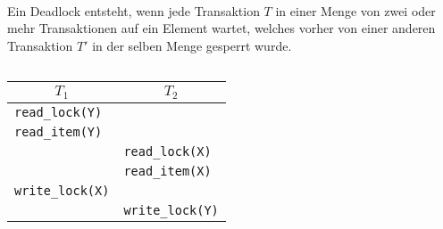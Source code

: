 \begin{frame}{\insertsection}
	\framesubtitle{\insertsubsection}
	\begin{definition}
		Ein Deadlock entsteht, wenn jede Transaktion $T$ in einer Menge von zwei oder mehr Transaktionen auf ein Element wartet, welches vorher von einer anderen Transaktion $T'$ in der selben Menge gesperrt wurde.
	\end{definition}	
	\begin{columns}
		\begin{column}{.48\textwidth}
			\begin{tabular}{p{3.0cm}|p{3.0cm}}
				\multicolumn{1}{c|}{\small $T_1$} & \multicolumn{1}{c}{\small $T_2$}\\\hline
				\small \texttt{read\_lock(Y)} & \\
				\small \texttt{read\_item(Y)} & \\
				& \small \texttt{read\_lock(X)} \\
				& \small \texttt{read\_item(X)} \\
				\small \texttt{write\_lock(X)} & \\
				& \small \texttt{write\_lock(Y)} \\
			\end{tabular}
		\end{column}
		\begin{column}{.48\textwidth}			
			\begin{center}
			\end{center}
		\end{column}
	\end{columns}
\end{frame}

